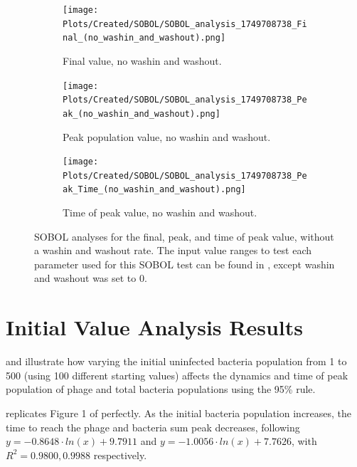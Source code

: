 \begin{figure}[ht!]
    \centering
    \begin{subfigure}{0.32\linewidth}
        \centering
        \captionsetup{width=1\linewidth}
        \texttt{[image: Plots/Created/SOBOL/SOBOL\_analysis\_1749708738\_Final\_(no\_washin\_and\_washout).png]}
        \caption{
            Final value, no washin and washout. 
        }
        \label{fig:created:SOBOL_final_no_wi_wo}
    \end{subfigure}
    \hfill
    \begin{subfigure}{0.32\linewidth}
        \centering
        \captionsetup{width=1\linewidth}
        \texttt{[image: Plots/Created/SOBOL/SOBOL\_analysis\_1749708738\_Peak\_(no\_washin\_and\_washout).png]}
        \caption{
            Peak population value, no washin and washout. 
        }
        \label{fig:created:SOBOL_peak_no_wi_wo}
    \end{subfigure}
    \hfill
    \begin{subfigure}{0.32\linewidth}
        \centering
        \captionsetup{width=1\linewidth}
        \texttt{[image: Plots/Created/SOBOL/SOBOL\_analysis\_1749708738\_Peak\_Time\_(no\_washin\_and\_washout).png]}
        \caption{
            Time of peak value, no washin and washout. 
        }
        \label{fig:created:SOBOL_peak_time_no_wi_wo}
    \end{subfigure}
    \caption{
        SOBOL analyses for the final, peak, and time of peak value, without a washin and washout rate.
        The input value ranges to test each parameter used for this SOBOL test can be found in , except washin and washout was set to 0. 
    }
    \label{fig:created:SOBOL_no_wi_wo}
\end{figure}

\section{Initial Value Analysis Results}
\label{sec:results:initial_value_analysis}

 and  illustrate how varying the initial uninfected bacteria population from 1 to 500 (using 100 different starting values) affects the dynamics and time of peak population of phage and total bacteria populations using the 95\% rule. 

 replicates Figure 1 of \citet{mullaExtremeDiversityPhage2024} perfectly. 
As the initial bacteria population increases, the time to reach the phage and bacteria sum peak decreases, following $y = -0.8648\cdot ln(x) + 9.7911$ and $y = -1.0056\cdot ln(x)+7.7626$, with $R^2=0.9800, 0.9988$ respectively. 


